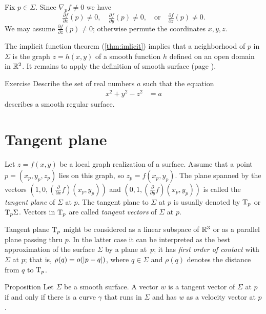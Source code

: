 Fix $p\in\Sigma$.
Since $\nabla_p f\ne 0$ we have 
\[\tfrac{\partial f}{\partial x}(p)\ne 0,\quad \tfrac{\partial f}{\partial y}(p)\ne 0,\quad \text{or}\quad\tfrac{\partial f}{\partial z}(p)\ne 0.\]
We may assume $\tfrac{\partial f}{\partial z}(p)\ne 0$;
otherwise permute the coordinates $x,y,z$.

The implicit function theorem (\ref{thm:imlicit}) implies that a neighborhood of $p$ in $\Sigma$ is the graph $z=h(x,y)$ of a smooth function $h$ defined on an open domain in $\mathbb{R}^2$.
It remains to apply the definition of smooth surface (page \pageref{page:def-smooth-surface}).
\qeds

\begin{thm}{Exercise}\label{ex:hyperboloinds}
Describe the set of real numbers $a$
such that the equation
\begin{align*}
x^2+y^2-z^2&=a
\end{align*}
describes a smooth regular surface.
\end{thm}

\section*{Tangent plane}

Let $z=f(x,y)$ be a local graph realization of a surface. 
Assume that a point $p=(x_p,y_p,z_p)$ lies on this graph, so $z_p=f(x_p,y_p)$.
The plane spanned by the vectors $(1,0,(\tfrac{\partial}{\partial x}f)(x_p,y_p))$ and  $(0,1,(\tfrac{\partial}{\partial y}f)(x_p,y_p))$ is called the \emph{tangent plane} of $\Sigma$ at $p$.
The tangent plane to $\Sigma$ at $p$ is usually denoted by $\mathrm{T}_p$ or $\mathrm{T}_p\Sigma$.
Vectors in $\mathrm{T}_p$ are called \emph{tangent vectors} of $\Sigma$ at $p$.

Tangent plane $\mathrm{T}_p$ might be considered as a linear subspace of $\mathbb{R}^3$ or as a parallel plane passing thru $p$.
In the latter case it can be interpreted as the best approximation of the surface $\Sigma$ by a plane at~$p$;
it has \emph{first order of contact} with $\Sigma$ at $p$;
that is, $\rho(q)\z=o(|p-q|)$, where $q\in \Sigma$ and $\rho(q)$ denotes the distance from $q$ to $\mathrm{T}_p$. %

\begin{thm}{Proposition}
Let $\Sigma$ be a smooth surface.
A vector $w$ is a tangent vector of $\Sigma$ at $p$ if and only if there is a curve $\gamma$ that runs in $\Sigma$ and has $w$ as a velocity vector at $p$.  
\end{thm}

